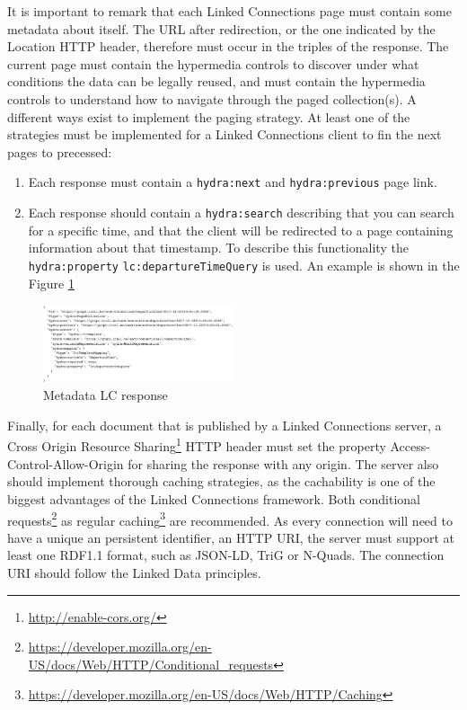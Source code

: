 \documentclass[sw]{iosart2x}
\begin{document}
It is important to remark that each Linked Connections page must contain some metadata about itself. The URL after redirection, or the one indicated by the Location HTTP header, therefore must occur in the triples of the response. The current page must contain the hypermedia controls to discover under what conditions the data can be legally reused, and must contain the hypermedia controls to understand how to navigate through the paged collection(s). A different ways exist to implement the paging strategy. At least one of the strategies must be implemented for a Linked Connections client to fin the next pages to precessed:
\begin{enumerate}
\item Each response must contain a \texttt{hydra:next} and \texttt{hydra:previous} page link.
\item Each response should contain a \texttt{hydra:search} describing that you can search for a specific time, and that the client will be redirected to a page containing information about that timestamp. To describe this functionality the \texttt{hydra:property} \texttt{lc:departureTimeQuery} is used. An example is shown in the Figure \ref{fig:metadata}
\end{enumerate}

\begin{figure}[t]
	\includegraphics[width=0.5\textwidth]{images/search.png}
	\caption{Metadata LC response}\label{fig:metadata}
\end{figure}

Finally, for each document that is published by a Linked Connections server, a Cross Origin Resource Sharing\footnote{\url{http://enable-cors.org/}} HTTP header must set the property Access-Control-Allow-Origin for sharing the response with any origin. The server also should implement thorough caching strategies, as the cachability is one of the biggest advantages of the Linked Connections framework. Both conditional requests\footnote{\url{https://developer.mozilla.org/en-US/docs/Web/HTTP/Conditional_requests}} as regular caching\footnote{\url{https://developer.mozilla.org/en-US/docs/Web/HTTP/Caching}} are recommended. As every connection will need to have a unique an persistent identifier, an HTTP URI, the server must support at least one RDF1.1 format, such as JSON-LD\cite{world2014json}, TriG\cite{bizer2014rdf} or N-Quads\cite{cyganiak2008n}. The connection URI should follow the Linked Data principles\cite{bizer2009linked}.
\end{document}
